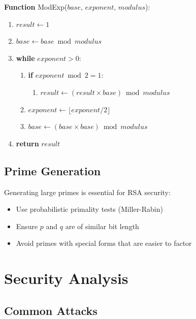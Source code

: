 	\begin{tcolorbox}[colback=blue!5!white,colframe=blue!75!black,title=Algorithm: Modular Exponentiation]
		\textbf{Function} ModExp($base$, $exponent$, $modulus$):
		\begin{enumerate}
			\item $result \gets 1$
			\item $base \gets base \bmod modulus$
			\item \textbf{while} $exponent > 0$:
			\begin{enumerate}
				\item \textbf{if} $exponent \bmod 2 = 1$:
				\begin{enumerate}
					\item $result \gets (result \times base) \bmod modulus$
				\end{enumerate}
				\item $exponent \gets \lfloor exponent / 2 \rfloor$
				\item $base \gets (base \times base) \bmod modulus$
			\end{enumerate}
			\item \textbf{return} $result$
		\end{enumerate}
	\end{tcolorbox}
	
	\subsection{Prime Generation}
	
	Generating large primes is essential for RSA security:
	
	\begin{itemize}
		\item Use probabilistic primality tests (Miller-Rabin)
		\item Ensure $p$ and $q$ are of similar bit length
		\item Avoid primes with special forms that are easier to factor
	\end{itemize}
	
	\section{Security Analysis}
	
	\subsection{Common Attacks}
	
